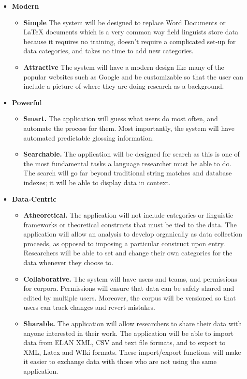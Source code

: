 \documentclass[12 pt]{article}
\begin{document}
\begin{itemize}


\item {\bf Modern}

\begin{itemize}
\item { \bf Simple} The system will be designed to replace Word Documents or LaTeX documents which is a very common way field linguists store data because it requires no training, doesn't require a complicated set-up for data categories, and takes no time to add new categories.  

\item {\bf Attractive} The system will have a modern design like many of the popular websites such as Google and be customizable so that the user can include a picture of where they are doing research as a background.

\end{itemize}

\item {\bf Powerful}
\begin{itemize}
\item {\bf Smart.} The application will guess what users do most often, and automate the process for them. Most importantly, the system will have automated predictable glossing information.
\item {\bf  Searchable.} The application will be designed for search as this is one of the most fundamental tasks a language researcher must be able to do. The search will go far beyond traditional string matches and database indexes; it will be able to display data in context.
\end{itemize}

\item{\bf Data-Centric}
\begin{itemize}
\item {\bf Atheoretical.} The application will not include categories or linguistic frameworks or theoretical constructs that must be tied to the data.  The application will allow an analysis to develop organically as data collection proceeds, as opposed to imposing a particular construct upon entry.  Researchers will be able to set and change their own categories for the data whenever they choose to.
\item {\bf Collaborative.} The system will have users and teams, and permissions for corpora. Permissions will ensure that data can be safely shared and edited by multiple users. Moreover, the corpus will be versioned so that users can track changes and revert mistakes.
\item {\bf Sharable.} The application will allow researchers to share their data with anyone interested in their work. The application will be able to import data from ELAN XML, CSV and text file formats, and to export to XML, Latex and WIki formats. These import/export functions will make it easier to exchange data with those who are not using the same application. 
\end{itemize}



\end{itemize}
\end{document}
